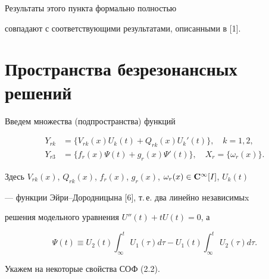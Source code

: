 \begin{note}


Результаты этого пункта формально полностью


совпадают с соответствующими результатами, описанными в [1].


\end{note}





\section{Пространства безрезонансных решений}





Введем множества (подпространства) функций


\begin{equation}


\begin{split}


Y_{rk} &= \bigl\{ V_{rk} (x) U_k (t) + Q_{rk} (x) U_k ' (t) \bigr\},


\quad k=1, 2,\\


%


Y_{r3} &= \bigl\{ f_{r} (x) {\Psi} (t) + g_{r} (x) \Psi ' (t)


\bigr\}, \quad X_r = \bigl\{ \omega_r (x)\bigr\}.


\end{split}


\end{equation}


Здесь $V_{rk} (x)$, $Q_{rk} (x)$, $f_{r} (x)$, $g_r


(x)$, $ \omega_r (x) \in \bold{C}^{\infty} [I]$, $U_k (t)$


--- функции Эйри--Дородницына [6], т.\,е. два линейно независимыx


решения модельного уравнения $U''(t) + t U(t) = 0$, а


\begin{equation}


\Psi (t) \equiv U_2 (t) \int _{\infty}^t U_1 (\tau) d \tau -


U_1 (t) \int _{\infty}^t U_2 (\tau) d \tau.


\end{equation}





Укажем на некоторые свойства СОФ (2.2).






